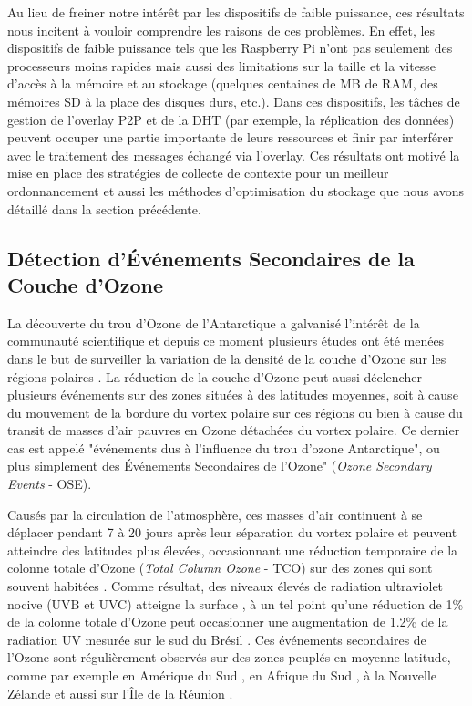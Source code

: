 Au lieu de freiner notre intérêt par les dispositifs de faible puissance, ces résultats nous incitent à vouloir comprendre les raisons de ces problèmes. En effet, les dispositifs de faible puissance tels que les Raspberry Pi n'ont pas seulement des processeurs moins rapides mais aussi des limitations sur la taille et la vitesse d'accès à la mémoire et au stockage (quelques centaines de MB de RAM, des mémoires SD à la place des disques durs, etc.). Dans ces dispositifs, les tâches de gestion de l'overlay P2P et de la DHT (par exemple, la réplication des données) peuvent occuper une partie importante de leurs ressources et finir par interférer avec le traitement des messages échangé via l'overlay.  Ces résultats ont motivé la mise en place des stratégies de collecte de contexte pour un meilleur ordonnancement et aussi les méthodes d'optimisation du stockage que nous avons détaillé dans la section précédente. 

\subsection{Détection d'Événements Secondaires de la Couche d'Ozone}

La découverte du trou d'Ozone de l'Antarctique \cite{Farman1985} a galvanisé l'intérêt de la communauté scientifique et depuis ce moment plusieurs études ont été menées dans le but de surveiller la variation de la densité de la couche d'Ozone sur les régions polaires \cite{Solomon1999}\cite{Salby2012}. La réduction de la couche d'Ozone peut aussi déclencher plusieurs événements sur des zones situées à des latitudes moyennes, soit à cause du mouvement de la bordure du vortex polaire sur ces régions  \cite{Kirchhoff1997}\cite{Marchand2005} ou bien à cause du transit de masses d'air pauvres en Ozone détachées du vortex polaire. Ce dernier cas est appelé "événements dus à l'influence du trou d'ozone Antarctique", ou plus simplement des Événements Secondaires de l'Ozone" (\textit{Ozone Secondary Events}  - OSE). 

Causés par la circulation de l'atmosphère, ces masses d'air continuent à se déplacer pendant 7 à 20 jours après leur séparation du vortex polaire et peuvent atteindre des latitudes plus élevées, occasionnant une réduction temporaire de la colonne totale d'Ozone (\textit{Total Column Ozone} - TCO) sur des zones qui sont souvent habitées \cite{Prather1990}\cite{Waugh1994}\cite{Manney1994}. Comme résultat, des niveaux élevés de radiation ultraviolet nocive (UVB et UVC) atteigne la surface \cite{Casiccia2008}, à un tel point qu'une réduction de 1\% de la colonne totale d'Ozone peut occasionner une augmentation de 1.2\% de la radiation UV mesurée sur le sud du Brésil \cite{Guarnieri2004}. Ces événements secondaires de l'Ozone sont régulièrement observés sur des zones peuplés en moyenne latitude, comme par exemple en Amérique du Sud \cite{Kirschhoff1996}\cite{Pinheiro2011}, en Afrique du Sud \cite{Semane2006}\cite{Sivakumar2007}, à la Nouvelle Zélande \cite{Brinksma1998} et aussi sur l'Île de la Réunion \cite{toihir2015}. 

